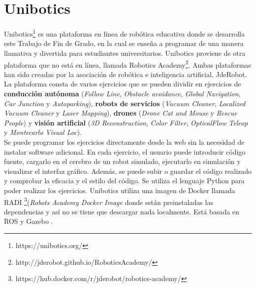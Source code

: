 \section{Unibotics}

Unibotics\footnote{https://unibotics.org/} es una plataforma en línea de robótica educativa donde se desarrolla este Trabajo de Fin  de Grado, en la cual se enseña a programar de una manera llamativa y divertida para estudiantes universitarios. Unibotics proviene de otra plataforma que no está en línea, llamada Robotics Academy\footnote{http://jderobot.github.io/RoboticsAcademy/}. Ambas plataformas han sido creadas por la asociación de robótica e inteligencia artificial, JdeRobot.\\


La plataforma consta de varios ejercicios que se pueden dividir en ejercicios de \textbf{conducción autónoma} (\textit{Follow Line}, \textit{Obstacle avoidance}, \textit{Global Navigation}, \textit{Car Junction} y \textit{Autoparking}), \textbf{robots de servicios }(\textit{Vacuum Cleaner}, \textit{Localized Vacuum Cleaner} y \textit{Laser Mapping}), \textbf{drones} (\textit{Drone Cat and Mouse} y \textit{Rescue People}) y \textbf{visión artificial} (\textit{3D Reconstruction}, \textit{Color Filter}, \textit{OpticalFlow Teleop} y \textit{Montecarlo Visual Loc}).\\

Se puede programar los ejercicios directamente desde la web sin la necesidad de instalar software adicional. En cada ejercicio, el usuario puede introducir código fuente, cargarlo en el cerebro de un robot simulado, ejecutarlo en simulación y visualizar el interfaz gráﬁco. Además, se puede subir o guardar el código realizado y comprobar la eficacia y el estilo del código. Se utiliza el lenguaje Python para poder realizar los ejercicios. Unibotics utiliza una imagen de Docker llamada RADI \footnote{https://hub.docker.com/r/jderobot/robotics-academy/}(\textit{Robots Academy Docker Image} donde están preinstaladas las dependencias y así no se tiene que descargar nada localmente. Está basada en ROS y Gazebo \cite{robotics}.\\


